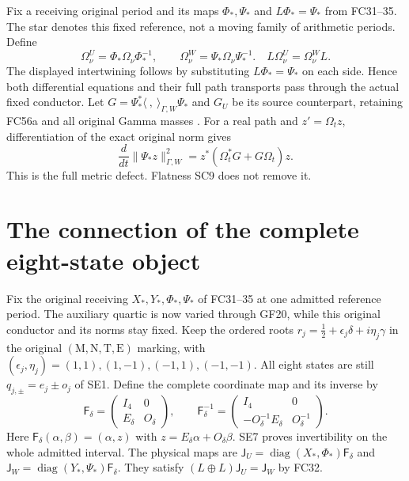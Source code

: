 Fix a receiving original period and its maps $\Phi_*,\Psi_*$ and
$L\Phi_*=\Psi_*$ from FC31--35. The star denotes this fixed reference,
not a moving family of arithmetic periods. Define
\[
 \Omega^U_\nu=\Phi_*\Omega_\nu\Phi_*^{-1},\qquad
 \Omega^W_\nu=\Psi_*\Omega_\nu\Psi_*^{-1}.
 \quad L\Omega^U_\nu=\Omega^W_\nu L. \tag{SC11}
\]
The displayed intertwining follows by substituting $L\Phi_*=\Psi_*$
on each side. Hence both differential equations and their full path
transports pass through the actual fixed conductor. Let
$G=\Psi_*^*\langle\ ,\ \rangle_{\Gamma,W}\Psi_*$ and $G_U$ be its
source counterpart, retaining FC56a and all original Gamma masses
\cite{fullfable:WCF}. For a real path and $z'=\Omega_tz$, differentiation of
the exact original norm gives
\[
 \frac{d}{dt}\|\Psi_*z\|_{\Gamma,W}^2
       =z^*(\Omega_t^*G+G\Omega_t)z. \tag{SC12}
\]
This is the full metric defect. Flatness SC9 does not remove it.

\section{The connection of the complete eight-state object}
Fix the original receiving $X_*,Y_*,\Phi_*,\Psi_*$ of FC31--35 at
one admitted reference period. The auxiliary quartic is now varied
through GF20, while this original conductor and its norms stay fixed.
Keep the ordered roots
$r_j=\tfrac12+\epsilon_j\delta+i\eta_j\gamma$ in the original
$(\mathrm M,\mathrm N,\mathrm T,\mathrm E)$ marking, with
$(\epsilon_j,\eta_j)=(1,1),(1,-1),(-1,1),(-1,-1)$.
All eight states are still $q_{j,\pm}=e_j\pm o_j$ of SE1.
Define the complete coordinate map and its inverse by
\[
 \mathsf F_\delta=
 \begin{pmatrix}I_4&0\\ E_\delta&O_\delta\end{pmatrix},\qquad
 \mathsf F_\delta^{-1}=
 \begin{pmatrix}I_4&0\\-O_\delta^{-1}E_\delta&O_\delta^{-1}\end{pmatrix}.
 \tag{TC1}
\]
Here $\mathsf F_\delta(\alpha,\beta)=(\alpha,z)$ with
$z=E_\delta\alpha+O_\delta\beta$. SE7 proves invertibility on the
whole admitted interval. The physical maps are
$\mathsf J_U=\operatorname{diag}(X_*,\Phi_*)\mathsf F_\delta$ and
$\mathsf J_W=\operatorname{diag}(Y_*,\Psi_*)\mathsf F_\delta$.
They satisfy $(L\oplus L)\mathsf J_U=\mathsf J_W$ by FC32.

